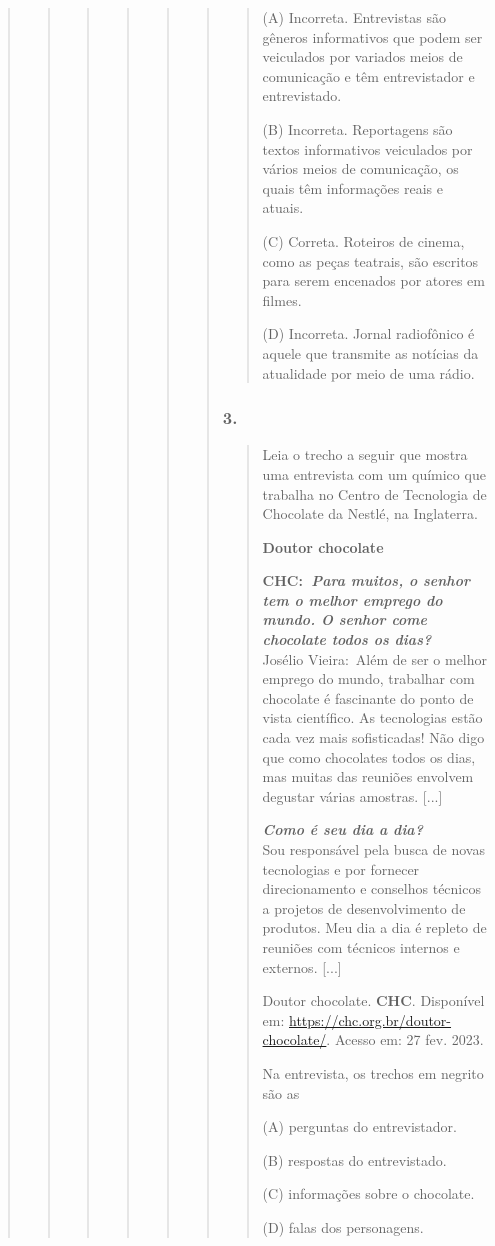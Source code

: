 \begin{quote}
\begin{quote}
\begin{quote}
\begin{quote}
\begin{quote}
\begin{quote}
\begin{quote}
(A) Incorreta. Entrevistas são gêneros informativos que podem ser
veiculados por variados meios de comunicação e têm entrevistador e
entrevistado.

(B) Incorreta. Reportagens são textos informativos veiculados por vários
meios de comunicação, os quais têm informações reais e atuais.

(C) Correta. Roteiros de cinema, como as peças teatrais, são escritos
para serem encenados por atores em filmes.

(D) Incorreta. Jornal radiofônico é aquele que transmite as notícias da
atualidade por meio de uma rádio.
\end{quote}

\subsubsection{3. }\label{section-86}

\begin{quote}
Leia o trecho a seguir que mostra uma entrevista com um químico que
trabalha no Centro de Tecnologia de Chocolate da Nestlé, na Inglaterra.

\textbf{Doutor chocolate}

\textbf{CHC:\emph{~Para muitos, o senhor tem o melhor emprego do mundo.
O senhor come chocolate todos os dias?}}\\
Josélio Vieira:~Além de ser o melhor emprego do mundo, trabalhar com
chocolate é fascinante do ponto de vista científico. As tecnologias
estão cada vez mais sofisticadas! Não digo que como chocolates todos os
dias, mas muitas das reuniões envolvem degustar várias amostras.
{[}...{]}

\emph{\textbf{Como é seu dia a dia?}}\\
Sou responsável pela busca de novas tecnologias e por fornecer
direcionamento e conselhos técnicos a projetos de desenvolvimento de
produtos. Meu dia a dia é repleto de reuniões com técnicos internos e
externos. {[}...{]}

Doutor chocolate. \textbf{CHC}. Disponível em:
\url{https://chc.org.br/doutor-chocolate/}. Acesso em: 27 fev. 2023.

Na entrevista, os trechos em negrito são as

(A) perguntas do entrevistador.

(B) respostas do entrevistado.

(C) informações sobre o chocolate.

(D) falas dos personagens.


\end{quote}
\end{quote}
\end{quote}
\end{quote}
\end{quote}
\end{quote}
\end{quote}

